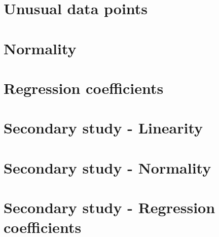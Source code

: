 \documentclass{sigchi}
\begin{document}
\section{Unusual data points} %
\label{sec:unusual_data_points}
\hfill \break

\clearpage

\section{Normality} %
\label{app:normality}
\hfill \break

\clearpage

\section{Regression coefficients} %
\label{sec:regression_coefficients}
\hfill \break

\clearpage

\section{Secondary study - Linearity}
\label{app:sec_linearity}
\hfill \break

\clearpage

\section{Secondary study - Normality} %
\label{sec:sec_normality}
\hfill \break

\clearpage

\section{Secondary study - Regression coefficients}
\label{sec:sec_regression_coefficients}
\hfill \break

\clearpage


\end{document}
